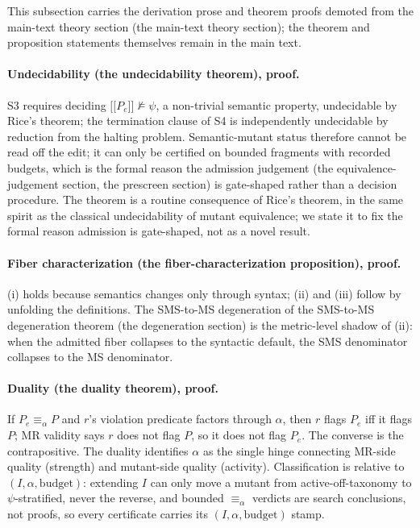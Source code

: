 \documentclass[manuscript,screen,review]{acmart}
\begin{document}
This subsection carries the derivation prose and theorem proofs demoted from the
main-text theory section (the main-text theory section); the theorem and
proposition statements themselves remain in the main text.

\paragraph{Undecidability (the undecidability theorem), proof.}
S3 requires deciding $\mathopen{\lbrack\!\lbrack} P_e \mathclose{\rbrack\!\rbrack} \not\models \psi$, a non-trivial
semantic property, undecidable by Rice's theorem; the termination clause of S4
is independently undecidable by reduction from the halting problem.
Semantic-mutant status therefore cannot be read off the edit; it can only be
certified on bounded fragments with recorded budgets, which is the formal reason
the admission judgement (the equivalence-judgement section,
the prescreen section) is gate-shaped
rather than a decision procedure. The theorem is a routine consequence of Rice's
theorem, in the same spirit as the classical undecidability of mutant
equivalence; we state it to fix the formal reason admission is gate-shaped, not
as a novel result.

\paragraph{Fiber characterization (the fiber-characterization proposition), proof.}
(i) holds because semantics changes only through syntax; (ii) and (iii) follow by
unfolding the definitions. The SMS-to-MS degeneration of
the SMS-to-MS degeneration theorem (the degeneration section)
is the metric-level shadow of (ii): when the admitted fiber collapses to the
syntactic default, the SMS denominator collapses to the MS denominator.

\paragraph{Duality (the duality theorem), proof.}
If $P_e \equiv_\alpha P$ and $r$'s violation predicate factors through $\alpha$,
then $r$ flags $P_e$ iff it flags $P$; MR validity says $r$ does not flag $P$, so
it does not flag $P_e$. The converse is the contrapositive. The duality
identifies $\alpha$ as the single hinge connecting MR-side quality (strength) and
mutant-side quality (activity). Classification is relative to
$(I, \alpha, \text{budget})$: extending $I$ can only move a mutant from
active-off-taxonomy to $\psi$-stratified, never the reverse, and bounded
$\equiv_\alpha$ verdicts are search conclusions, not proofs, so every certificate
carries its $(I, \alpha, \text{budget})$ stamp.
\end{document}
